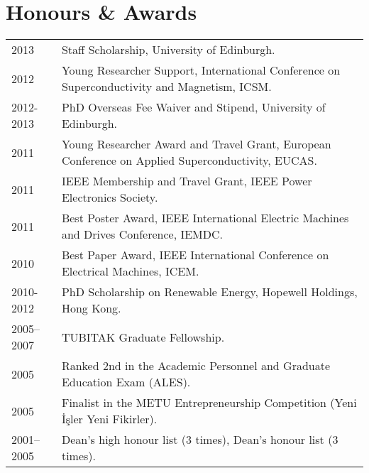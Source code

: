 \documentclass[a4paper,12pt]{article}
\begin{document}
\section{Honours \& Awards}
\begin{tabular}{lp{16cm}}
2013 & Staff Scholarship, University of Edinburgh. \\
2012 & Young Researcher Support, International Conference on Superconductivity and Magnetism, ICSM.\\ 
2012-2013 & PhD Overseas Fee Waiver and Stipend, University of Edinburgh. \\
2011 & Young Researcher Award and Travel Grant, European Conference on Applied Superconductivity, EUCAS.\\ 
2011 & IEEE Membership and Travel Grant, IEEE Power Electronics Society. \\ 
2011 & Best Poster Award, IEEE International Electric Machines and Drives Conference, IEMDC. \\
2010 & Best Paper Award, IEEE International Conference on Electrical Machines, ICEM. \\
2010-2012 & PhD Scholarship on Renewable Energy, Hopewell Holdings, Hong Kong. \\
2005--2007 & TUBITAK Graduate Fellowship. \\
2005 & Ranked 2nd in the Academic Personnel and Graduate Education Exam (ALES).\\
2005 & Finalist in the METU Entrepreneurship Competition (Yeni İşler Yeni Fikirler).\\
2001--2005 & Dean's high honour list (3 times), Dean's honour list (3 times). \\
\end{tabular}
\end{document}
